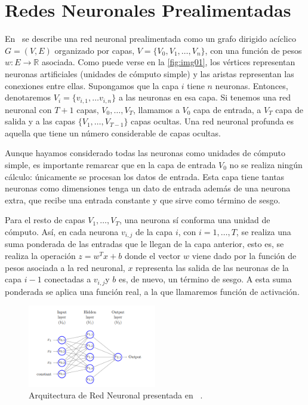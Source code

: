 \section{Redes Neuronales Prealimentadas} 
 En~\cite{shalev-shwartz2014understanding} se describe una red neuronal prealimentada como un grafo dirigido acíclico $G=(V,E)$  organizado por capas, $V=\{V_{0},V_{1},\ldots,V_{n}\}$, con una función de pesos $w: E\rightarrow \mathds{R}$ asociada.  Como puede verse en la \autoref{fig:img01}, los vértices representan neuronas artificiales (unidades de cómputo simple) y las aristas representan las conexiones entre ellas. Supongamos que la capa $i$ tiene $n$ neuronas. Entonces, denotaremos $V_{i} = \{v_{i,1},\dots v_{i,n}\}$ a las neuronas en esa capa. Si tenemos una red neuronal con  $T+1$ capas, $V_{0},\dots,V_{T}$, llamamos a $V_{0}$ capa de entrada, a $V_{T}$ capa de salida y a las capas $\{V_{1},\dots , V_{T-1} \}$ capas ocultas. Una red neuronal profunda es aquella que tiene un número considerable de capas ocultas. 

 Aunque hayamos considerado todas las neuronas como unidades de cómputo simple, es importante remarcar que en la capa de entrada $V_{0}$ no se realiza ningún cálculo: únicamente se procesan los datos de entrada. Esta capa tiene tantas neuronas como dimensiones tenga un dato de entrada además de una neurona extra, que recibe una entrada constante y que sirve como término de sesgo. 
 
Para el resto de capas $V_{1},\dots ,V_{T}$, una neurona sí conforma una unidad de cómputo. Así, en cada neurona $v_{i,j}$ de la capa $i$, con $i=1,\dots,T$, se realiza una suma ponderada de las entradas que le llegan de la capa anterior, esto es, se realiza la operación $z = w^{T}x+b$ donde el vector $w$ viene dado por la función de pesos asociada a la red neuronal, $x$ representa las salida de las neuronas de la capa $i-1$ conectadas a $v_{i,j}$y $b$ es, de nuevo, un término de sesgo. A esta suma ponderada se aplica una función real, a la que llamaremos función de activación. \\ 
 \begin{figure}[ht]
    \centering
    \includegraphics[width=0.5\textwidth]{img/img01.png}
    \caption{Arquitectura de Red Neuronal presentada en ~\cite{shalev-shwartz2014understanding}.}
    \label{fig:img01}
\end{figure}

